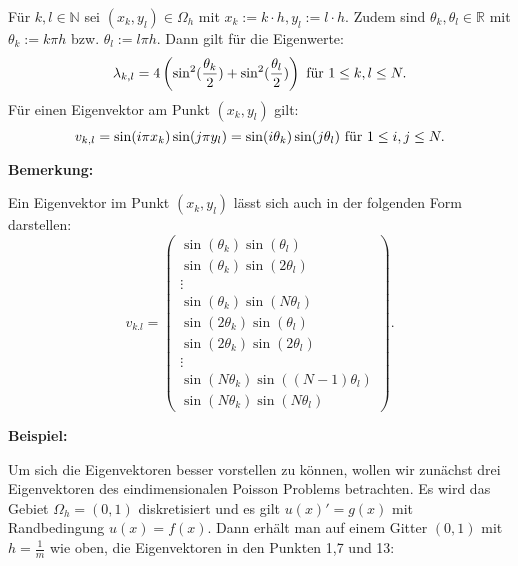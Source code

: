 Für $k,l \in \mathbb{N}$ sei $(x_{k},y_{l}) \in \Omega_{h}$ mit $x_{k} := k \cdot h, y_{l} := l \cdot h$. Zudem sind $\theta_{k}, \theta_{l} \in \mathbb{R}$ mit $\theta_{k} := k \pi h$ bzw. $\theta_{l} := l \pi h$. Dann gilt für die Eigenwerte:
\begin{equation}
\lambda_{k,l} = 4 \left(\sin^{2}(\frac {\theta_{k}} {2}) + \sin^{2}(\frac {\theta_{l}} {2}) \right) \textnormal{ für } 1 \le k,l \le N.\label{eq.Eigenwerte}
\end{equation}
Für einen Eigenvektor am Punkt $(x_{k},y_{l})$ gilt:
\begin{equation}
v_{k,l} = \sin(i \pi x_{k}) \sin(j \pi y_{l}) = \sin(i\theta_{k}) \sin(j\theta_{l}) \textnormal{ für } 1 \le i,j \le N.
\end{equation}

\textbf{Bemerkung:}

Ein Eigenvektor im Punkt $(x_{k},y_{l})$ lässt sich auch in der folgenden Form darstellen:
\begin{equation}
v_{k.l} = 
\begin{pmatrix}
\sin(\theta_{k})\sin(\theta_{l})\\
\sin(\theta_{k})\sin(2 \theta_{l})\\
\vdots \\
\sin(\theta_{k})\sin(N \theta_{l})\\
\sin(2 \theta_{k})\sin(\theta_{l})\\
\sin(2 \theta_{k})\sin(2 \theta_{l})\\
\vdots\\
\sin(N \theta_{k})\sin((N-1) \theta_{l})\\
\sin(N \theta_{k})\sin(N \theta_{l})
\end{pmatrix}.
\end{equation}

\textbf{Beispiel:}

Um sich die Eigenvektoren besser vorstellen zu können, wollen wir zunächst drei Eigenvektoren des eindimensionalen Poisson Problems betrachten. Es wird das Gebiet $\Omega_{h} = (0,1)$ diskretisiert und es gilt $u(x)' = g(x)$ mit Randbedingung $u(x) = f(x)$. Dann erhält man auf einem Gitter $(0,1)$ mit $h = \frac{1}{m}$ wie oben, die Eigenvektoren in den Punkten 1,7 und 13:

\label{img.1D Langwelle}

